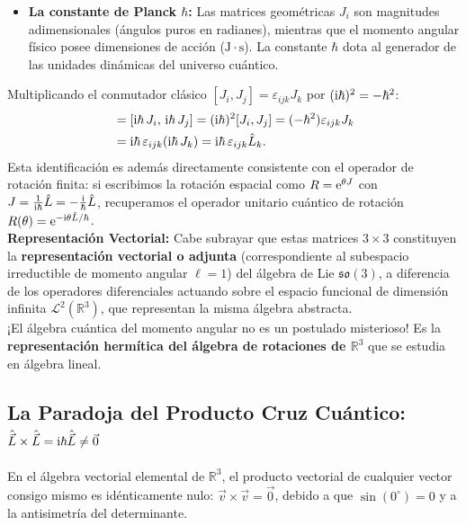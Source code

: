 \begin{alertabox}
\begin{itemize}
        \item \textbf{La constante de Planck $\hbar$:} Las matrices geométricas $J_i$ son magnitudes adimensionales (ángulos puros en radianes), mientras que el momento angular físico posee dimensiones de acción ($\mathrm{J}\cdot\mathrm{s}$). La constante $\hbar$ dota al generador de las unidades dinámicas del universo cuántico.
    \end{itemize}
    Multiplicando el conmutador clásico $[J_i, J_j] = \varepsilon_{ijk}J_k$ por $(\mathrm{i}\hbar)^2 = -\hbar^2$:
    \begin{align}
        [\hat{L}_i, \hat{L}_j] &= [\iu\hbar\,J_i, \, \iu\hbar\,J_j] = (\iu\hbar)^2 [J_i, J_j] = (-\hbar^2)\varepsilon_{ijk}J_k \nonumber\\
        &= \iu\hbar\,\varepsilon_{ijk}(\iu\hbar\,J_k) = \iu\hbar\,\varepsilon_{ijk}\hat{L}_k.
    \end{align}
    Esta identificación es además directamente consistente con el operador de rotación finita: si escribimos la rotación espacial como $R = \mathrm{e}^{\theta J}$ con $J = \frac{1}{\mathrm{i}\hbar}\hat{L} = -\frac{\mathrm{i}}{\hbar}\hat{L}$, recuperamos el operador unitario cuántico de rotación $R(\theta) = \mathrm{e}^{-\mathrm{i}\theta\hat{L}/\hbar}$.\\
    \textbf{Representación Vectorial:} Cabe subrayar que estas matrices $3\times 3$ constituyen la \textbf{representación vectorial o adjunta} (correspondiente al subespacio irreductible de momento angular $\ell=1$) del álgebra de Lie $\mathfrak{so}(3)$, a diferencia de los operadores diferenciales actuando sobre el espacio funcional de dimensión infinita $\mathcal{L}^2(\mathbb{R}^3)$, que representan la misma álgebra abstracta.\\
    ¡El álgebra cuántica del momento angular no es un postulado misterioso! Es la \textbf{representación hermítica del álgebra de rotaciones de $\mathbb{R}^3$} que se estudia en álgebra lineal.
\end{alertabox}

\subsection{La Paradoja del Producto Cruz Cuántico: \texorpdfstring{$\hat{\vec{L}} \times \hat{\vec{L}} = \mathrm{i}\hbar\hat{\vec{L}} \neq \vec{0}$}{L x L = ihbar L}}

En el álgebra vectorial elemental de $\mathbb{R}^3$, el producto vectorial de cualquier vector consigo mismo es idénticamente nulo: $\vec{v} \times \vec{v} = \vec{0}$, debido a que $\sin(0^\circ) = 0$ y a la antisimetría del determinante.

